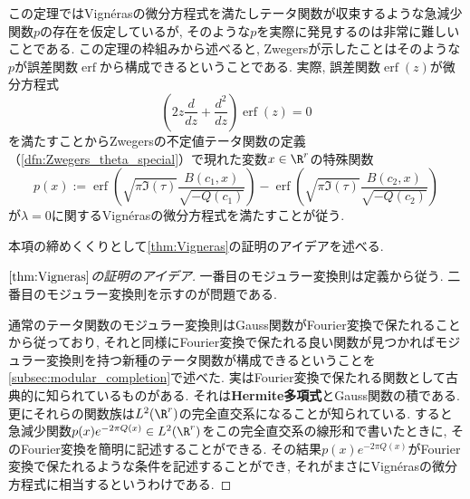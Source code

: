 \documentclass[11pt,b5paper,oneside,lualatex]{ltjsarticle} %
\DeclareMathOperator{\erf}{erf}
\numberwithin{equation}{section} %
\begin{document}
この定理ではVign\'{e}rasの微分方程式を満たしテータ関数が収束するような急減少関数$ p $の存在を仮定しているが, そのような$ p $を実際に発見するのは非常に難しいことである. 
この定理の枠組みから述べると, Zwegersが示したことはそのような$ p $が誤差関数$ \erf $から構成できるということである. 
実際, 誤差関数$ \erf(z) $が微分方程式
\[
\left( 2 z \frac{d}{dz} + \frac{d^2}{dz} \right) \erf(z) = 0
\]
を満たすことからZwegersの不定値テータ関数の定義（\cref{dfn:Zwegers_theta_special}）で現れた変数$ x \in \R^r $の特殊関数
\[
p(x) :=
\erf \left( \sqrt{\pi \Im(\tau)} \frac{B(c_1, x)}{\sqrt{-Q(c_1)}} \right) - \erf \left( \sqrt{\pi \Im(\tau)} \frac{B(c_2, x)}{\sqrt{-Q(c_2)}} \right)
\]
が$ \lambda = 0 $に関するVign\'{e}rasの微分方程式を満たすことが従う. 

本項の締めくくりとして\cref{thm:Vigneras}の証明のアイデアを述べる. 

\begin{proof}[$ \cref{thm:Vigneras} $の証明のアイデア]
	一番目のモジュラー変換則は定義から従う. 
	二番目のモジュラー変換則を示すのが問題である. 
	
	通常のテータ関数のモジュラー変換則はGauss関数がFourier変換で保たれることから従っており, それと同様にFourier変換で保たれる良い関数が見つかればモジュラー変換則を持つ新種のテータ関数が構成できるということを\cref{subsec:modular_completion}で述べた. 
	実はFourier変換で保たれる関数として古典的に知られているものがある. 
	それは\textbf{Hermite多項式}とGauss関数の積である. 
	更にそれらの関数族は$ L^2(\R^r) $の完全直交系になることが知られている. 
	すると急減少関数$ p(x) e^{-2\pi Q(x)} \in L^2(\R^r) $をこの完全直交系の線形和で書いたときに, そのFourier変換を簡明に記述することができる. 
	その結果$ p(x) e^{-2\pi Q(x)} $がFourier変換で保たれるような条件を記述することができ, それがまさにVign\'{e}rasの微分方程式に相当するというわけである. 	
\end{proof}



\end{document}
